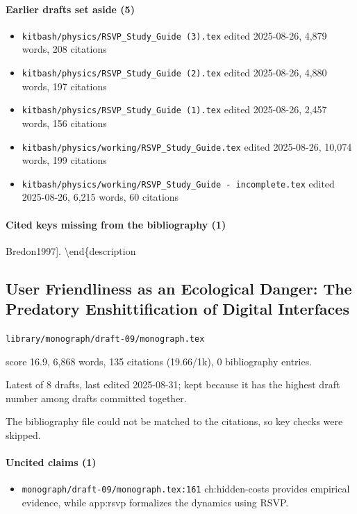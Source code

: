 \documentclass[11pt]{article}
\newcommand{\loc}[1]{{\small\color{muted}\texttt{#1}}}
\begin{document}
\paragraph{Earlier drafts set aside (5)}
\begin{itemize}
\item \loc{kitbash/\allowbreak{}physics/\allowbreak{}RSVP\_Study\_Guide (3).tex} edited 2025-08-26, 4,879 words, 208 citations
\item \loc{kitbash/\allowbreak{}physics/\allowbreak{}RSVP\_Study\_Guide (2).tex} edited 2025-08-26, 4,880 words, 197 citations
\item \loc{kitbash/\allowbreak{}physics/\allowbreak{}RSVP\_Study\_Guide (1).tex} edited 2025-08-26, 2,457 words, 156 citations
\item \loc{kitbash/\allowbreak{}physics/\allowbreak{}working/\allowbreak{}RSVP\_Study\_Guide.tex} edited 2025-08-26, 10,074 words, 199 citations
\item \loc{kitbash/\allowbreak{}physics/\allowbreak{}working/\allowbreak{}RSVP\_Study\_Guide - incomplete.tex} edited 2025-08-26, 6,215 words, 60 citations
\end{itemize}
\paragraph{Cited keys missing from the bibliography (1)}
{\small\ttfamily\raggedright Bredon1997].
\textbackslash{}end\{description\par}
\subsection{User Friendliness as an Ecological Danger: The Predatory Enshittification of Digital Interfaces}
\loc{library/\allowbreak{}monograph/\allowbreak{}draft-09/\allowbreak{}monograph.tex}\par
score 16.9, 6,868 words, 135 citations (19.66/1k), 0 bibliography entries.

Latest of 8 drafts, last edited 2025-08-31; kept because it has the highest draft number among drafts committed together.

The bibliography file could not be matched to the citations, so key checks were skipped.

\paragraph{Uncited claims (1)}
\begin{itemize}
\item \loc{monograph/\allowbreak{}draft-09/\allowbreak{}monograph.tex:161} ch:hidden-costs provides empirical evidence, while app:rsvp formalizes the dynamics using RSVP.
\end{itemize}
\end{document}

